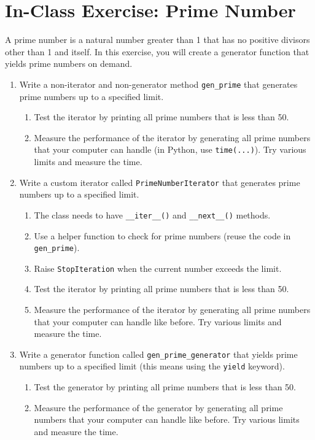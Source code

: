 \documentclass[oneside,11pt,dvipsnames]{book}
\newcommand{\code}[1]{\texttt{#1}}
\begin{document}
\section{In-Class Exercise: Prime Number}

A prime number is a natural number greater than 1 that has no positive divisors other than 1 and itself. In this exercise, you will create a generator function that yields prime numbers on demand.
\begin{enumerate}
    
    \item Write a non-iterator and non-generator method \code{gen\_prime} that generates prime numbers up to a specified limit.
    \begin{enumerate}
    \item Test the iterator by printing all prime numbers that is less than 50.
    \item Measure the performance of the iterator by generating all prime numbers that your computer can handle (in Python, use \code{time(...)}).  Try various limits and measure the time.
    \end{enumerate}

\item Write a custom iterator called \code{PrimeNumberIterator} that generates prime numbers up to a specified limit.
\begin{enumerate}
    \item The class needs to have \code{\_\_iter\_\_()} and \code{\_\_next\_\_()} methods.
    \item Use a helper function to check for prime numbers (reuse the code in \code{gen\_prime}).
    \item Raise \code{StopIteration} when the current number exceeds the limit.
    \item Test the iterator by printing all prime numbers that is less than 50.
    \item Measure the performance of the iterator by generating all prime numbers that your computer can handle like before.  Try various limits and measure the time.
\end{enumerate}
\item Write a generator function called \code{gen\_prime\_generator} that yields prime numbers up to a specified limit (this means using the \code{yield} keyword).
\begin{enumerate}
    \item Test the generator by printing all prime numbers that is less than 50.
    \item Measure the performance of the generator by generating all prime numbers that your computer can handle like before.  Try various limits and measure the time.
\end{enumerate}
\end{enumerate}
\end{document}
